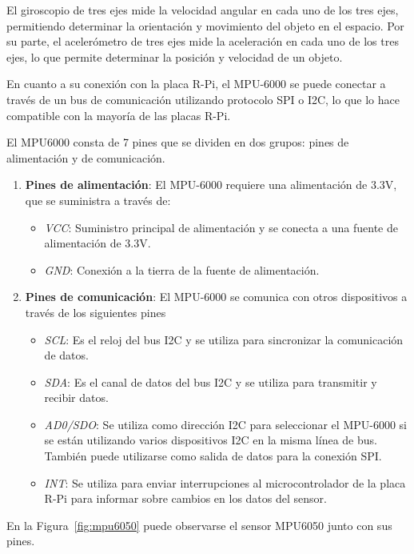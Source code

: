 El giroscopio de tres ejes mide la velocidad angular en cada uno de los tres ejes, permitiendo determinar la orientación y movimiento del objeto en el espacio. Por su parte, el acelerómetro de tres ejes mide la aceleración en cada uno de los tres ejes, lo que permite determinar la posición y velocidad de un objeto.

En cuanto a su conexión con la placa R-Pi, el MPU-6000 se puede conectar a través de un bus de comunicación utilizando protocolo SPI o I2C, lo que lo hace compatible con la mayoría de las placas R-Pi. 

El MPU6000 consta de 7 pines que se dividen en dos grupos: pines de alimentación y de comunicación. 

\begin{enumerate}
\item \textbf{Pines de alimentación}: El MPU-6000 requiere una alimentación de 3.3V, que se suministra a través de:

\begin{itemize}
\item \textit{VCC}: Suministro principal de alimentación y se conecta a una fuente de alimentación de 3.3V.
\item \textit{GND}: Conexión a la tierra de la fuente de alimentación.
\end{itemize}

\item \textbf{Pines de comunicación}: El MPU-6000 se comunica con otros dispositivos a través de los siguientes pines

\begin{itemize}
\item \textit{SCL}: Es el reloj del bus I2C y se utiliza para sincronizar la comunicación de datos.
\item \textit{SDA}: Es el canal de datos del bus I2C y se utiliza para transmitir y recibir datos.
\item \textit{AD0/SDO}: Se utiliza como dirección I2C para seleccionar el MPU-6000 si se están utilizando varios dispositivos I2C en la misma línea de bus. También puede utilizarse como salida de datos para la conexión SPI.
\item \textit{INT}: Se utiliza para enviar interrupciones al microcontrolador de la placa R-Pi para informar sobre cambios en los datos del sensor.
\end{itemize}
\end{enumerate}

En la Figura~\ref{fig:mpu6050} puede observarse el sensor MPU6050 junto con sus pines. 

